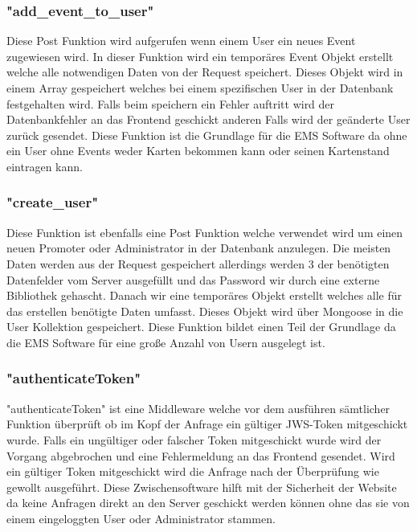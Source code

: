 		 	\subsubsection{"add\_event\_to\_user"}
		 		Diese Post Funktion wird aufgerufen wenn einem User ein neues Event zugewiesen wird. In dieser Funktion wird ein temporäres Event Objekt erstellt welche alle notwendigen Daten von der Request speichert. Dieses Objekt wird in einem Array gespeichert welches bei einem spezifischen User in der Datenbank festgehalten wird. Falls beim speichern ein Fehler auftritt wird der Datenbankfehler an das Frontend geschickt anderen Falls wird der geänderte User zurück gesendet. Diese Funktion ist die Grundlage für die EMS Software da ohne ein User ohne Events weder Karten bekommen kann oder seinen Kartenstand eintragen kann.
		 		
		 	
		 	\subsubsection{"create\_user"}
		 		Diese Funktion ist ebenfalls eine Post Funktion welche verwendet wird um einen neuen Promoter oder Administrator in der Datenbank anzulegen. Die meisten Daten werden aus der Request gespeichert allerdings werden 3 der benötigten Datenfelder vom Server ausgefüllt und das Password wir durch eine externe Bibliothek gehascht. Danach wir eine temporäres Objekt erstellt welches alle für das erstellen benötigte Daten umfasst. Dieses Objekt wird über Mongoose in die User Kollektion gespeichert. Diese Funktion bildet einen Teil der Grundlage da die EMS Software für eine große Anzahl von Usern ausgelegt ist. 
		 		
		 		
		 	\subsubsection{"authenticateToken"}
		 		"authenticateToken" ist eine Middleware welche vor dem ausführen sämtlicher Funktion überprüft ob im Kopf der Anfrage ein gültiger JWS-Token mitgeschickt wurde. Falls ein ungültiger oder falscher Token mitgeschickt wurde wird der Vorgang abgebrochen und eine Fehlermeldung an das Frontend gesendet. Wird ein gültiger Token mitgeschickt wird die Anfrage nach der Überprüfung wie gewollt ausgeführt. Diese Zwischensoftware hilft mit der Sicherheit der Website da keine Anfragen direkt an den Server geschickt werden können ohne das sie von einem eingeloggten User oder Administrator stammen. 
		 		
